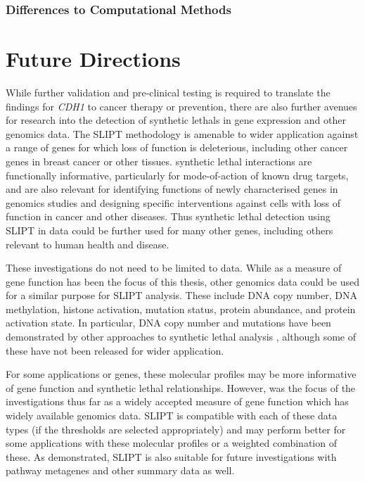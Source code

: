 \subsubsection{Differences to Computational Methods}
\label{chapt6:slipt_compare_computational}
\fi

\section{Future Directions}
\label{chapt6:future}

While further validation and pre-clinical testing is required to translate the findings for \textit{CDH1} to cancer therapy or prevention, there are also further avenues for research into the detection of \glspl{synthetic lethal} in \gls{gene expression} and other \glspl{genomic} data. The \gls{SLIPT} methodology is amenable to wider application against a range of genes for which loss of function is deleterious, including other cancer genes in breast cancer or other tissues. \Gls{synthetic lethal} interactions are functionally informative, particularly for mode-of-action of known drug targets, and are also relevant for identifying functions of newly characterised genes in \glspl{genomic} studies and designing specific interventions against cells with loss of function in cancer and other diseases. Thus \gls{synthetic lethal} detection using \gls{SLIPT} in  data could be further used for many other genes, including others relevant to human health and disease.

These investigations do not need to be limited to  data. While  as a measure of gene function has been the focus of this thesis, other \glspl{genomic} data could be used for a similar purpose for \gls{SLIPT} analysis. These include \acrshort{DNA} copy number, \acrshort{DNA} methylation, histone activation, \gls{mutation} status, protein abundance, and protein activation state. In particular, \acrshort{DNA} copy number and \glspl{mutation} have been demonstrated by other approaches to \gls{synthetic lethal} analysis \citep{Jerby2014, Srihari2015, Lu2015, Wappett2016}, although some of these have not been released for wider application. 

For some applications or genes, these molecular profiles may be more informative of gene function and \gls{synthetic lethal} relationships. However,  was the focus of the investigations thus far as a widely accepted measure of gene function which has widely available \glspl{genomic} data.  \gls{SLIPT} is compatible with each of these data types (if the thresholds are selected appropriately) and may perform better for some applications with these molecular profiles or a weighted combination of these. As demonstrated, \gls{SLIPT} is also suitable for future investigations with pathway \glspl{metagene} and other summary data as well.

